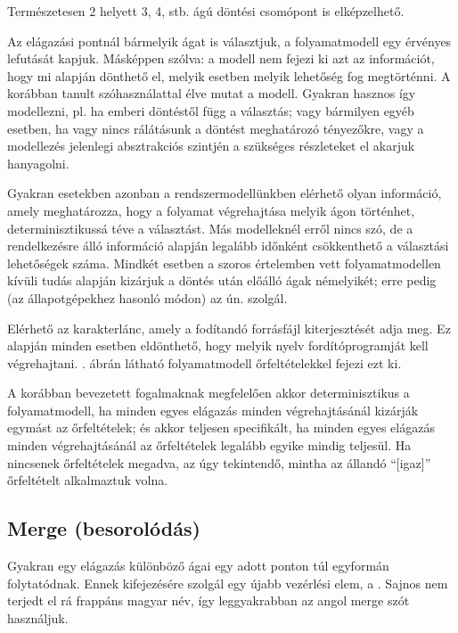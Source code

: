 Természetesen 2 helyett 3, 4, stb. ágú döntési csomópont is elképzelhető.

Az elágazási pontnál bármelyik ágat is választjuk, a folyamatmodell egy érvényes lefutását kapjuk. Másképpen szólva: a modell nem fejezi ki azt az információt, hogy mi alapján dönthető el, melyik esetben melyik lehetőség fog megtörténni. A korábban tanult szóhasználattal élve  mutat a modell. Gyakran hasznos így modellezni, pl. ha emberi döntéstől függ a választás; vagy bármilyen egyéb esetben, ha vagy nincs rálátásunk a döntést meghatározó tényezőkre, vagy a modellezés jelenlegi absztrakciós szintjén a szükséges részleteket el akarjuk hanyagolni. 

Gyakran esetekben azonban a rendszermodellünkben elérhető olyan információ, amely meghatározza, hogy a folyamat végrehajtása melyik ágon történhet, determinisztikussá téve a választást. Más modelleknél erről nincs szó, de a rendelkezésre álló információ alapján legalább időnként csökkenthető a választási lehetőségek száma. Mindkét esetben a szoros értelemben vett folyamatmodellen kívüli tudás alapján kizárjuk a döntés után előálló ágak némelyikét; erre pedig (az állapotgépekhez hasonló módon) az ún.  szolgál. 

\begin{pelda}
Elérhető az  karakterlánc, amely a fodítandó forrásfájl kiterjesztését adja meg. Ez alapján minden esetben eldönthető, hogy melyik nyelv fordítóprogramját kell végrehajtani. . ábrán látható folyamatmodell őrfeltételekkel fejezi ezt ki.
\end{pelda}


A korábban bevezetett fogalmaknak megfelelően akkor determinisztikus a folyamatmodell, ha minden egyes elágazás minden végrehajtásánál kizárják egymást az őrfeltételek; és akkor teljesen specifikált, ha minden egyes elágazás minden végrehajtásánál az őrfeltételek legalább egyike mindig teljesül. Ha nincsenek őrfeltételek megadva, az úgy tekintendő, mintha az állandó ``[igaz]'' őrfeltételt alkalmaztuk volna.

\subsection{Merge (besorolódás)}
Gyakran egy elágazás különböző ágai egy adott ponton túl egyformán folytatódnak. Ennek kifejezésére szolgál egy újabb vezérlési elem, a . Sajnos nem terjedt el rá frappáns magyar név, így leggyakrabban az angol merge szót használjuk.

